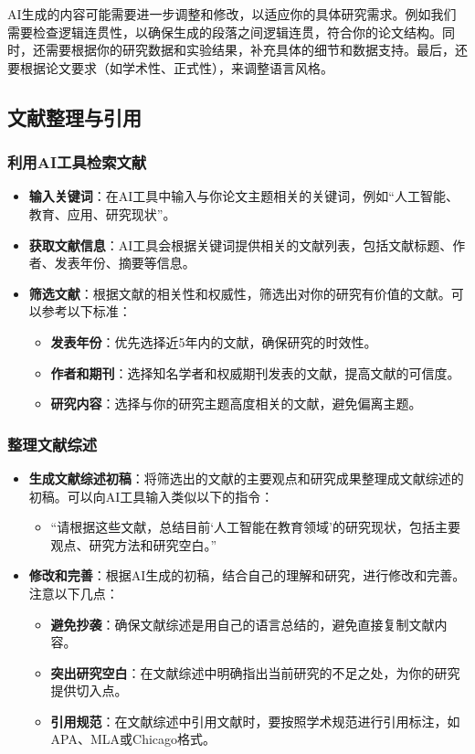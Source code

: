     AI生成的内容可能需要进一步调整和修改，以适应你的具体研究需求。例如我们需要检查逻辑连贯性，以确保生成的段落之间逻辑连贯，符合你的论文结构。同时，还需要根据你的研究数据和实验结果，补充具体的细节和数据支持。最后，还要根据论文要求（如学术性、正式性），来调整语言风格。


\subsection{文献整理与引用}
\subsubsection{利用AI工具检索文献}
\begin{itemize}
    \item \textbf{输入关键词}：在AI工具中输入与你论文主题相关的关键词，例如“人工智能、教育、应用、研究现状”。
    \item \textbf{获取文献信息}：AI工具会根据关键词提供相关的文献列表，包括文献标题、作者、发表年份、摘要等信息。
    \item \textbf{筛选文献}：根据文献的相关性和权威性，筛选出对你的研究有价值的文献。可以参考以下标准：
    \begin{itemize}
        \item \textbf{发表年份}：优先选择近5年内的文献，确保研究的时效性。
        \item \textbf{作者和期刊}：选择知名学者和权威期刊发表的文献，提高文献的可信度。
        \item \textbf{研究内容}：选择与你的研究主题高度相关的文献，避免偏离主题。
    \end{itemize}
\end{itemize}

\subsubsection{整理文献综述}
\begin{itemize}
    \item \textbf{生成文献综述初稿}：将筛选出的文献的主要观点和研究成果整理成文献综述的初稿。可以向AI工具输入类似以下的指令：
    \begin{itemize}
        \item “请根据这些文献，总结目前‘人工智能在教育领域’的研究现状，包括主要观点、研究方法和研究空白。”
    \end{itemize}
    \item \textbf{修改和完善}：根据AI生成的初稿，结合自己的理解和研究，进行修改和完善。注意以下几点：
    \begin{itemize}
        \item \textbf{避免抄袭}：确保文献综述是用自己的语言总结的，避免直接复制文献内容。
        \item \textbf{突出研究空白}：在文献综述中明确指出当前研究的不足之处，为你的研究提供切入点。
        \item \textbf{引用规范}：在文献综述中引用文献时，要按照学术规范进行引用标注，如APA、MLA或Chicago格式。
    \end{itemize}
\end{itemize}

